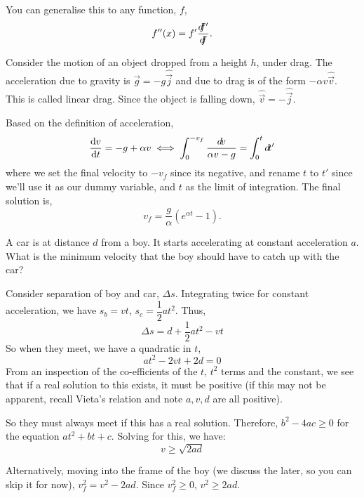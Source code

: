 You can generalise this to any function, $f$,
\begin{equation}
f''(x) = f'\frac{d\hspace{-0.35em}f'}{d\hspace{-0.35em}f}.
\end{equation}

\begin{example}
    Consider the motion of an object dropped from a height $h$, under 
    drag. The acceleration due to gravity is $\vec{g} = -g \hat{\vec{j}}$ and due to drag is of the form $-\alpha v \hat{\vec{v}}$. This is 
    called linear drag. Since the object is falling down, $\hat{\vec{v}} = -\hat{\vec{j}}$.

    Based on the definition of acceleration, 
    $$
    \dv{v}{t} = - g + \alpha v \iff \int_0^{-v_f} \frac{\mathop{}\!{d}\hspace{-0.1em}^{}\hspace{-0.11em}{v}}{\alpha v - g} = \int_0^{t} \mathop{}\!{d}\hspace{-0.1em}^{}\hspace{-0.11em}{t'}
    $$
    where we set the final velocity to $-v_f$ since its negative, and rename $t$ to $t'$ since we'll use it as our dummy variable, and $t$ as the limit of integration.
     The final solution is,
    $$v_f = \frac{g}{\alpha} (e^{\alpha t} - 1).$$
\end{example}

\begin{example}
    A car is at distance $d$ from a boy. It starts accelerating at constant acceleration $a$.  
    What is the minimum velocity that the boy should have to catch up with the car?

\begin{soln}
    Consider separation of boy and car, $\Delta s$. Integrating twice for constant acceleration, we have  
    $s_b = vt$, $s_c = \dfrac{1}{2}at^2$. Thus,
    \[
    \Delta s = d + \frac{1}{2}at^2 - vt
    \]
    So when they meet, we have a quadratic in $t$,
    \[
    at^2 - 2vt + 2d = 0
    \]
    From an inspection of the co-efficients of the $t$, $t^2$ terms and the constant, we see that if a real solution to this exists, 
    it must be positive (if this may not be apparent, recall Vieta's relation and note $a, v, d$ are all positive).

    So they must always meet if this has a real solution. Therefore, $b^2 - 4ac \geq 0$ for the equation
    $at^2 + bt + c$. Solving for this, we have:
    \[
    v \geq \sqrt{2ad}
    \]

    Alternatively, moving into the frame of the boy (we discuss the later, so you can skip it for now), 
    $v_f^2 = v^2 - 2ad$. Since $v_f^2 \ge 0$, $v^2 \ge 2ad$.
\end{soln}
\end{example}

